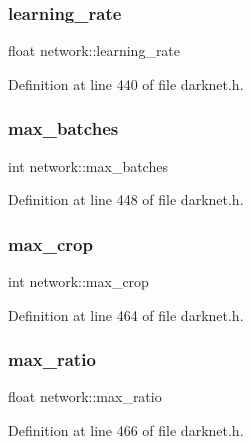 \subsubsection{\texorpdfstring{learning\_rate}{learning\_rate}}
{\footnotesize\ttfamily float network\+::learning\+\_\+rate}



Definition at line 440 of file darknet.\+h.

\mbox{\label{structnetwork_a163b931990a5ac8f456884405de2192b}} 
\subsubsection{\texorpdfstring{max\_batches}{max\_batches}}
{\footnotesize\ttfamily int network\+::max\+\_\+batches}



Definition at line 448 of file darknet.\+h.

\mbox{\label{structnetwork_af98abf1cccd7bfee97b9f7eae752687c}} 
\subsubsection{\texorpdfstring{max\_crop}{max\_crop}}
{\footnotesize\ttfamily int network\+::max\+\_\+crop}



Definition at line 464 of file darknet.\+h.

\mbox{\label{structnetwork_a181329911f37d2d5adce2290683a9897}} 
\subsubsection{\texorpdfstring{max\_ratio}{max\_ratio}}
{\footnotesize\ttfamily float network\+::max\+\_\+ratio}



Definition at line 466 of file darknet.\+h.

\mbox{\label{structnetwork_a9e52bfae3a850150ed2e32c10ab11bec}} 

